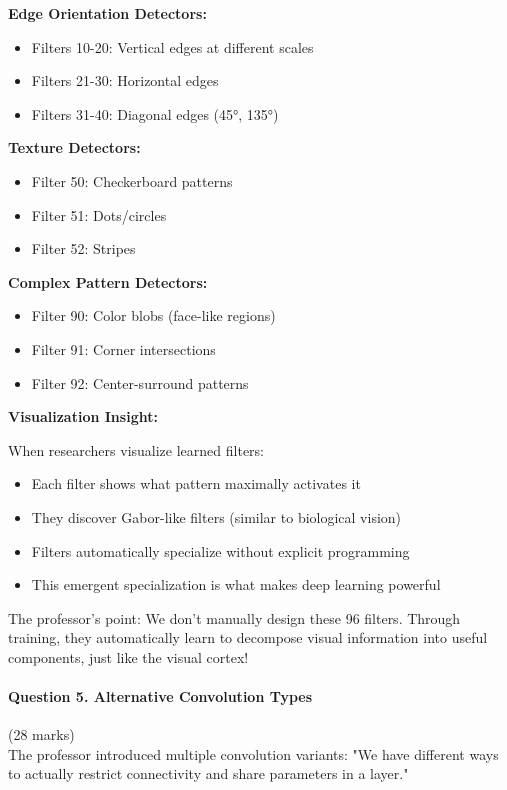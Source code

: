\documentclass[12pt]{article}
\newcommand{\explanation}[1]{{\color{explanationcolor}#1}}
\begin{document}
\begin{enumerate}[(a)]
{{    \textbf{Edge Orientation Detectors:}
    \begin{itemize}
        \item Filters 10-20: Vertical edges at different scales
        \item Filters 21-30: Horizontal edges
        \item Filters 31-40: Diagonal edges (45°, 135°)
    \end{itemize}
    
    \textbf{Texture Detectors:}
    \begin{itemize}
        \item Filter 50: Checkerboard patterns
        \item Filter 51: Dots/circles
        \item Filter 52: Stripes
    \end{itemize}
    
    \textbf{Complex Pattern Detectors:}
    \begin{itemize}
        \item Filter 90: Color blobs (face-like regions)
        \item Filter 91: Corner intersections
        \item Filter 92: Center-surround patterns
    \end{itemize}
    }
    
    \textbf{Visualization Insight:}
    
    \explanation{
    When researchers visualize learned filters:
    \begin{itemize}
        \item Each filter shows what pattern maximally activates it
        \item They discover Gabor-like filters (similar to biological vision)
        \item Filters automatically specialize without explicit programming
        \item This emergent specialization is what makes deep learning powerful
    \end{itemize}
    
    The professor's point: We don't manually design these 96 filters. Through training, they automatically learn to decompose visual information into useful components, just like the visual cortex!
    }
    }
\end{enumerate}

\newpage
\paragraph{Question 5. Alternative Convolution Types}{\hfill (28 marks)}\\
The professor introduced multiple convolution variants: "We have different ways to actually restrict connectivity and share parameters in a layer."
\end{document}

